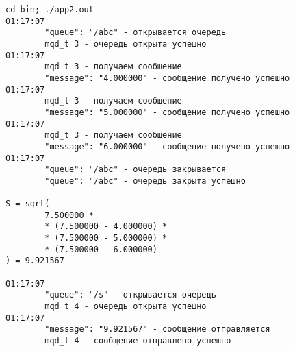 \begin{lstlisting}[language=Out, basicstyle=\ttfamily\scriptsize]
cd bin; ./app2.out
01:17:07
        "queue": "/abc" - открывается очередь
        mqd_t 3 - очередь открыта успешно
01:17:07
        mqd_t 3 - получаем сообщение
        "message": "4.000000" - сообщение получено успешно
01:17:07
        mqd_t 3 - получаем сообщение
        "message": "5.000000" - сообщение получено успешно
01:17:07
        mqd_t 3 - получаем сообщение
        "message": "6.000000" - сообщение получено успешно
01:17:07
        "queue": "/abc" - очередь закрывается
        "queue": "/abc" - очередь закрыта успешно

S = sqrt(
        7.500000 *
        * (7.500000 - 4.000000) *
        * (7.500000 - 5.000000) *
        * (7.500000 - 6.000000)
) = 9.921567

01:17:07
        "queue": "/s" - открывается очередь
        mqd_t 4 - очередь открыта успешно
01:17:07
        "message": "9.921567" - сообщение отправляется
        mqd_t 4 - сообщение отправлено успешно
\end{lstlisting}